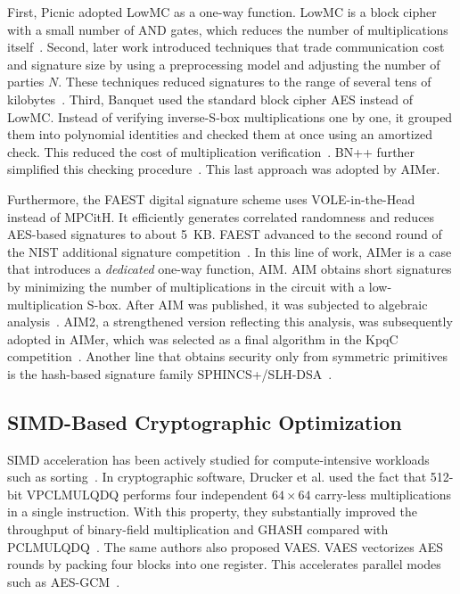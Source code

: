 First, Picnic adopted LowMC as a one-way function. LowMC is a block cipher with a small number of AND gates, which reduces the number of multiplications itself~\cite{chase2017post}. Second, later work introduced techniques that trade communication cost and signature size by using a preprocessing model and adjusting the number of parties $N$. These techniques reduced signatures to the range of several tens of kilobytes~\cite{katz2018improved}. Third, Banquet used the standard block cipher AES instead of LowMC. Instead of verifying inverse-S-box multiplications one by one, it grouped them into polynomial identities and checked them at once using an amortized check. This reduced the cost of multiplication verification~\cite{baum2021banquet}. BN++ further simplified this checking procedure~\cite{kales2022efficient}. This last approach was adopted by AIMer.

Furthermore, the FAEST digital signature scheme uses VOLE-in-the-Head~\cite{baum2023publicly} instead of MPCitH. It efficiently generates correlated randomness and reduces AES-based signatures to about 5~KB. FAEST advanced to the second round of the NIST additional signature competition~\cite{baum2025faest}. In this line of work, AIMer is a case that introduces a \emph{dedicated} one-way function, AIM. AIM obtains short signatures by minimizing the number of multiplications in the circuit with a low-multiplication S-box. After AIM was published, it was subjected to algebraic analysis~\cite{liu2023algebraic}. AIM2, a strengthened version reflecting this analysis, was subsequently adopted in AIMer, which was selected as a final algorithm in the KpqC competition~\cite{choaimer}. Another line that obtains security only from symmetric primitives is the hash-based signature family SPHINCS+/SLH-DSA~\cite{bernstein2019sphincs+,saarinen2024accelerating}.

\subsection{SIMD-Based Cryptographic Optimization}

SIMD acceleration has been actively studied for compute-intensive
workloads such as sorting~\cite{chhugani2008efficient}. In cryptographic software, Drucker et al. used the fact that 512-bit VPCLMULQDQ performs four independent $64\times64$ carry-less multiplications in a single instruction. With this property, they substantially improved the throughput of binary-field multiplication and GHASH compared with PCLMULQDQ~\cite{drucker2018fast}. The same authors also proposed VAES. VAES vectorizes AES rounds by packing four blocks into one register. This accelerates parallel modes such as AES-GCM~\cite{drucker2019making}.

